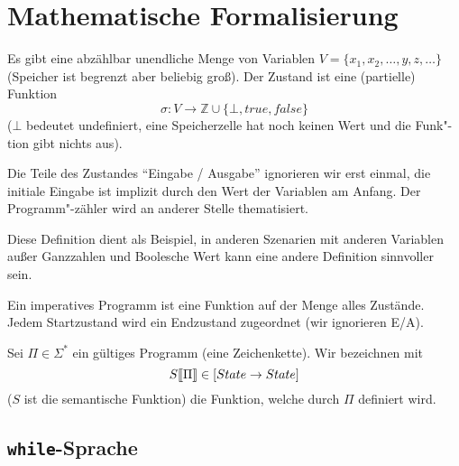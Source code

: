\section{Mathematische Formalisierung}

\begin{definition}[Zustand]
    Es gibt eine abzählbar unendliche Menge von Variablen $V = \{ x_1, x_2, \dots, y, z, \dots \}$ (Speicher ist begrenzt aber beliebig groß). Der Zustand ist eine (partielle) Funktion \[
    \sigma: V \to \mathbb{Z} \cup \{ \bot, true, false \}
    \]
    ($\bot$ bedeutet undefiniert, \dh{} eine Speicherzelle hat noch keinen Wert und die Funk"-tion gibt nichts aus).

    Die Teile des Zustandes ``Eingabe / Ausgabe'' ignorieren wir erst einmal, \dh{} die initiale Eingabe ist implizit durch den Wert der Variablen am Anfang. Der Programm"-zähler wird an anderer Stelle thematisiert.
\end{definition}

\begin{remark}
    Diese Definition dient als Beispiel, \dh{} in anderen Szenarien mit anderen Variablen außer Ganzzahlen und Boolesche Wert kann eine andere Definition sinnvoller sein.
\end{remark}

\begin{definition}
    Ein imperatives Programm ist eine Funktion auf der Menge alles Zustände. Jedem Startzustand wird ein Endzustand zugeordnet (wir ignorieren E/A).
\end{definition}

\begin{notation}
    Sei $\Pi \in \Sigma^*$ ein gültiges Programm (eine Zeichenkette). Wir bezeichnen mit
    \[
    S\mathrm{[}\kern-.14em\mathrm{[}\Pi\mathrm{]}\kern-.14em\mathrm{]} \in [State \to State]
    \]
    ($S$ ist die semantische Funktion) die Funktion, welche durch $\Pi$ definiert wird.
\end{notation}



\subsection{\texttt{while}-Sprache}\label{section:while}

